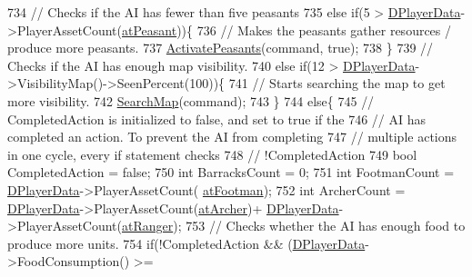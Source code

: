 \begin{DoxyCode}
734         \textcolor{comment}{// Checks if the AI has fewer than five peasants}
735         \textcolor{keywordflow}{else} \textcolor{keywordflow}{if}(5 > \hyperlink{classCAIPlayer_a83b5113c8f7e80df54940b647c5ee2e6}{DPlayerData}->PlayerAssetCount(\hyperlink{GameDataTypes_8h_a5600d4fc433b83300308921974477fecaf5e570c7e5a2266810f610e7f945ea61}{atPeasant}))\{
736             \textcolor{comment}{// Makes the peasants gather resources / produce more peasants.}
737             \hyperlink{classCAIPlayer_a3fab1c955fd68bb53fa80bb1872d2819}{ActivatePeasants}(command, \textcolor{keyword}{true});
738         \}
739         \textcolor{comment}{// Checks if the AI has enough map visibility.}
740         \textcolor{keywordflow}{else} \textcolor{keywordflow}{if}(12 > \hyperlink{classCAIPlayer_a83b5113c8f7e80df54940b647c5ee2e6}{DPlayerData}->VisibilityMap()->SeenPercent(100))\{
741             \textcolor{comment}{// Starts searching the map to get more visibility.}
742             \hyperlink{classCAIPlayer_afafbe8fc589e09a16ae1f02f2794d7b0}{SearchMap}(command);
743         \}
744         \textcolor{keywordflow}{else}\{
745             \textcolor{comment}{// CompletedAction is initialized to false, and set to true if the }
746             \textcolor{comment}{// AI has completed an action. To prevent the AI from completing}
747             \textcolor{comment}{// multiple actions in one cycle, every if statement checks}
748             \textcolor{comment}{// !CompletedAction}
749             \textcolor{keywordtype}{bool} CompletedAction = \textcolor{keyword}{false};
750             \textcolor{keywordtype}{int} BarracksCount = 0;
751             \textcolor{keywordtype}{int} FootmanCount = \hyperlink{classCAIPlayer_a83b5113c8f7e80df54940b647c5ee2e6}{DPlayerData}->PlayerAssetCount(
      \hyperlink{GameDataTypes_8h_a5600d4fc433b83300308921974477fecad586e8ff9ee846d22630c2066e8fb7c2}{atFootman});
752             \textcolor{keywordtype}{int} ArcherCount = \hyperlink{classCAIPlayer_a83b5113c8f7e80df54940b647c5ee2e6}{DPlayerData}->PlayerAssetCount(\hyperlink{GameDataTypes_8h_a5600d4fc433b83300308921974477feca7fad0074234068ff0af4092a75b929f8}{atArcher})+
      \hyperlink{classCAIPlayer_a83b5113c8f7e80df54940b647c5ee2e6}{DPlayerData}->PlayerAssetCount(\hyperlink{GameDataTypes_8h_a5600d4fc433b83300308921974477fecaafd2b1e0ca34872bb06098dbec9939e0}{atRanger});
753             \textcolor{comment}{// Checks whether the AI has enough food to produce more units.}
754             \textcolor{keywordflow}{if}(!CompletedAction && (\hyperlink{classCAIPlayer_a83b5113c8f7e80df54940b647c5ee2e6}{DPlayerData}->FoodConsumption() >= 

\end{DoxyCode}
